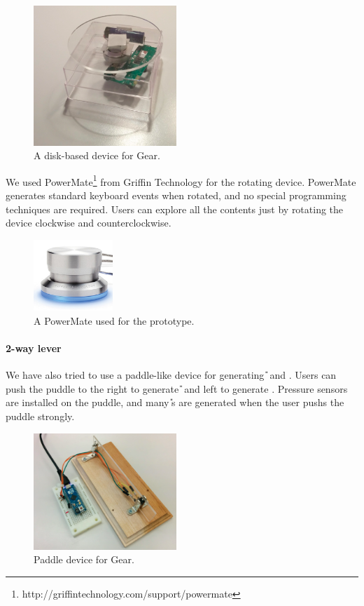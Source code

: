 \documentclass{article}
\begin{document}
\begin{figure}[H]
\centerline{\includegraphics[width=54mm,bb=0 0 362 354]{figures/ff2d18e66f9a4655dbb5e22e0bb9a0ae.png}}
\caption{A disk-based device for Gear.}
\label{disk}
\end{figure}

We used
PowerMate\footnote{
  \textsf{http://griffintechnology.com/support/powermate}
} from Griffin Technology for the rotating device.
PowerMate generates standard keyboard events when rotated,
and no special programming techniques are required.
%
Users can explore all the contents just by
rotating the device clockwise and counterclockwise.

\begin{figure}[H]
\centerline{\includegraphics[width=30mm,bb=0 0 389 348]{figures/d3a69499f7e7314ae6dc10f5bf3a2be5.png}}
\caption{A PowerMate used for the prototype.}
\label{powermate}
\end{figure}

\paragraph{2-way lever}

We have also tried to use a paddle-like device for generating {\U} and {\D}.
Users can push the puddle to the right to generate {\U} and
left to generate {\D}.
Pressure sensors are installed on the puddle, and
many {\U}s are generated when the user pushs the puddle strongly.

\begin{figure}[H]
  \centerline{\includegraphics[width=54mm,bb=0 0 514 418]{figures/3c2de63899653056f3c6be835b9aaf43.png}}
\caption{Paddle device for Gear.}
\label{paddle}
\end{figure}
\end{document}
